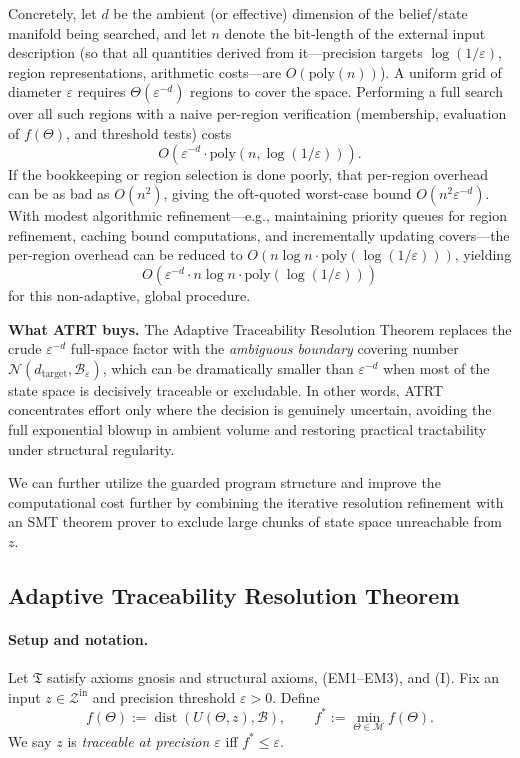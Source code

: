 \documentclass[12pt]{article}
\theoremstyle{definition}
\theoremstyle{plain}
\begin{document}
Concretely, let \(d\) be the ambient (or effective) dimension of the belief/state manifold being searched, and let \(n\) denote the bit-length of the external input description (so that all quantities derived from it—precision targets \(\log(1/\varepsilon)\), region representations, arithmetic costs—are \(O(\mathrm{poly}(n))\)).  A uniform grid of diameter \(\varepsilon\) requires \(\Theta(\varepsilon^{-d})\) regions to cover the space.  Performing a full search over all such regions with a naive per-region verification (membership, evaluation of \(f(\Theta)\), and threshold tests) costs
\[
O\!\left(
  \varepsilon^{-d} \cdot \mathrm{poly}(n,\log(1/\varepsilon))
\right).
\]
If the bookkeeping or region selection is done poorly, that per-region overhead can be as bad as \(O(n^2)\), giving the oft-quoted worst-case bound \(O(n^2\varepsilon^{-d})\).  With modest algorithmic refinement—e.g., maintaining priority queues for region refinement, caching bound computations, and incrementally updating covers—the per-region overhead can be reduced to \(O(n\log n\cdot \mathrm{poly}(\log(1/\varepsilon)))\), yielding
\[
O\!\left(
  \varepsilon^{-d} \cdot n\log n \cdot \mathrm{poly}(\log(1/\varepsilon))
\right)
\]
for this non-adaptive, global procedure.

\medskip\noindent\textbf{What ATRT buys.}  
The Adaptive Traceability Resolution Theorem replaces the crude \(\varepsilon^{-d}\) full-space factor with the \emph{ambiguous boundary} covering number \(\mathcal N(d_{\mathrm{target}},\mathcal B_{\varepsilon})\), which can be dramatically smaller than \(\varepsilon^{-d}\) when most of the state space is decisively traceable or excludable.  In other words, ATRT concentrates effort only where the decision is genuinely uncertain, avoiding the full exponential blowup in ambient volume and restoring practical tractability under structural regularity.

We can further utilize the guarded program structure and improve the computational cost further by combining the iterative resolution refinement with an SMT theorem prover to exclude large chunks of state space unreachable from $z$.

\subsection{Adaptive Traceability Resolution Theorem}
\label{thm:ATRT}

\paragraph{Setup and notation.}  
Let \(\mathfrak T\) satisfy axioms gnosis and structural axioms, (EM1–EM3), and (I). Fix an input \(z\in\mathcal Z^{\mathrm{in}}\) and precision threshold \(\varepsilon>0\). Define
\[
f(\Theta):=\operatorname{dist}(U(\Theta,z), \mathcal B), 
\qquad
f^* := \min_{\Theta\in\mathcal M} f(\Theta).
\]
We say \(z\) is \emph{traceable at precision \(\varepsilon\)} iff \(f^*\le \varepsilon\). 
\end{document}
